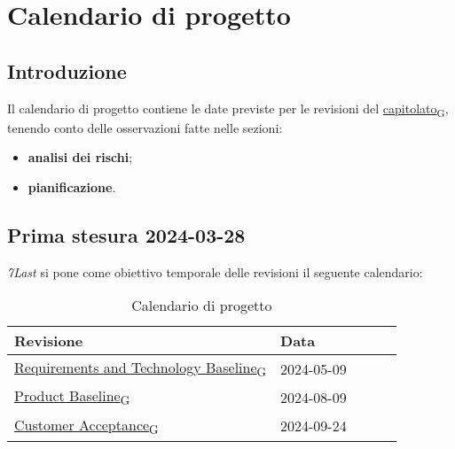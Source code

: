 \section{Calendario di progetto}
\subsection{Introduzione}
Il calendario di progetto contiene le date previste per le revisioni del \href{https://7last.github.io/docs/pb/documentazione-interna/glossario\#capitolato}{capitolato\textsubscript{G}}, tenendo conto delle osservazioni fatte nelle sezioni:
\begin{itemize}
    \item \textbf{analisi dei rischi};
    \item \textbf{pianificazione}.
\end{itemize}

\subsection{Prima stesura 2024-03-28}
\textit{7Last} si pone come obiettivo temporale delle revisioni il seguente calendario:
\begin{table}[!h]
    \begin{center}
        \begin{tabular}{ | l | l | l | l | l | }
            \hline
            Revisione                               & Data       \\ \hline
            \href{https://7last.github.io/docs/pb/documentazione-interna/glossario\#requirements-and-technology-baseline}{Requirements and Technology Baseline\textsubscript{G}}    & 2024-05-09 \\
            \href{https://7last.github.io/docs/pb/documentazione-interna/glossario\#product-baseline}{Product Baseline\textsubscript{G}}                        & 2024-08-09 \\
            \href{https://7last.github.io/docs/pb/documentazione-interna/glossario\#customer-acceptance}{Customer Acceptance\textsubscript{G}}                     & 2024-09-24 \\
            \hline
        \end{tabular}
    \end{center}
    \caption{Calendario di progetto}
\end{table}

